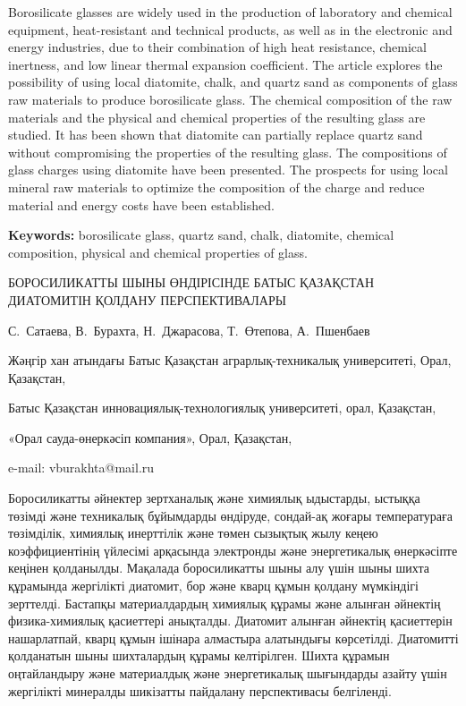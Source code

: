 Borosilicate glasses are widely used in the production of laboratory and
chemical equipment, heat-resistant and technical products, as well as in
the electronic and energy industries, due to their combination of high
heat resistance, chemical inertness, and low linear thermal expansion
coefficient. The article explores the possibility of using local
diatomite, chalk, and quartz sand as components of glass raw materials
to produce borosilicate glass. The chemical composition of the raw
materials and the physical and chemical properties of the resulting
glass are studied. It has been shown that diatomite can partially
replace quartz sand without compromising the properties of the resulting
glass. The compositions of glass charges using diatomite have been
presented. The prospects for using local mineral raw materials to
optimize the composition of the charge and reduce material and energy
costs have been established.

{\bfseries Keywords:} borosilicate glass, quartz sand, chalk, diatomite,
chemical composition, physical and che\-mical properties of glass.

\begin{header}
БОРОСИЛИКАТТЫ ШЫНЫ ӨНДІРІСІНДЕ БАТЫС ҚАЗАҚСТАН ДИАТОМИТІН ҚОЛДАНУ ПЕРСПЕКТИВАЛАРЫ

С.~Сатаева,
В.~Бурахта\envelope,
Н.~Джарасова,
Т.~Өтепова,
А.~Пшенбаев
\end{header}

\begin{affil}
Жәңгір хан атындағы Батыс Қазақстан аграрлық-техникалық университеті, Орал, Қазақстан,

Батыс Қазақстан инновациялық-технологиялық университеті, орал, Қазақстан,

«Орал сауда-өнеркәсіп компания», Орал, Қазақстан,

e-mail: vburakhta@mail.ru
\end{affil}

Боросиликатты әйнектер зертханалық және химиялық ыдыстарды, ыстыққа
төзімді және техникалық бұйымдарды өндіруде, сондай-ақ жоғары
температураға төзімділік, химиялық инерттілік және төмен сызықтық жылу
кеңею коэффициентінің үйлесімі арқасында электронды және энергетикалық
өнеркәсіпте кеңінен қолданылды. Мақалада боросиликатты шыны алу үшін
шыны шихта құрамында жергілікті диатомит, бор және кварц құмын қолдану
мүмкіндігі зерттелді. Бастапқы материалдардың химиялық құрамы және
алынған әйнектің физика-химиялық қасиеттері анықталды. Диатомит алынған
әйнектің қасиеттерін нашарлатпай, кварц құмын ішінара алмастыра
алатындығы көрсетілді. Диатомитті қолданатын шыны шихталардың құрамы
келтірілген. Шихта құрамын оңтайландыру және материалдық және
энергетикалық шығындарды азайту үшін жергілікті минералды шикізатты
пайдалану перспективасы белгіленді.

